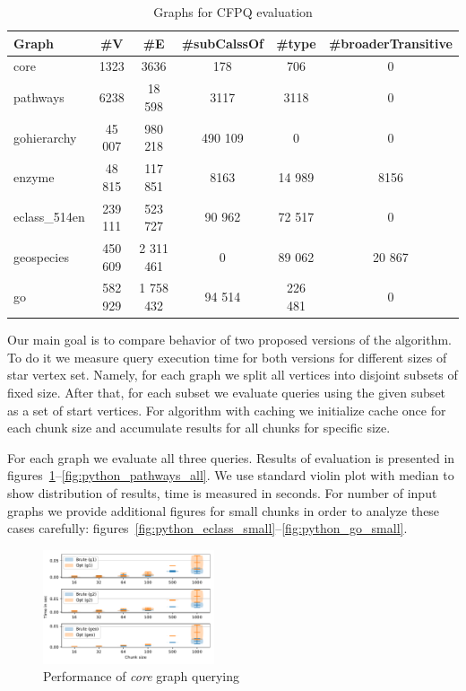 {\setlength{\tabcolsep}{0.2em}
\begin{table}
{
\caption{Graphs for CFPQ evaluation}
\label{tbl:graphs_for_cfpq}
\small
{}
\begin{tabular}{|l|c|c|c|c|c|}
\hline
Graph          & \#V       & \#E        & \#subCalssOf & \#type &\#broaderTransitive\\
\hline
\hline
core                        & 1323     & 3636       & 178       & 706      & 0      \\ 
pathways                    & 6238     & 18 598     & 3117      & 3118     & 0      \\ 
gohierarchy                 & 45 007   & 980 218    & 490 109   & 0        & 0      \\ 
enzyme                      & 48 815   & 117 851    & 8163      & 14 989   & 8156   \\ 
eclass\_514en               & 239 111  & 523 727    & 90 962    & 72 517   & 0      \\ 
geospecies                  & 450 609  & 2 311 461  & 0         & 89 062   & 20 867 \\
go                          & 582 929  & 1 758 432  & 94 514    & 226 481  & 0      \\ 
\hline
\end{tabular}
}
\end{table}
}


Our main goal is to compare behavior of two proposed versions of the algorithm.
To do it we measure query execution time for both versions for different sizes of star vertex set. 
Namely, for each graph we split all vertices into disjoint subsets of fixed size.
After that, for each subset we evaluate queries using the given subset as a set of start vertices. 
For algorithm with caching we initialize cache once for each chunk size and accumulate results for all chunks for specific size.

For each graph we evaluate all three queries. 
Results of evaluation is presented in figures~\ref{fig:python_core_all}--\ref{fig:python_pathways_all}.
We use standard violin plot with median to show distribution of results, time is measured in seconds.
For number of input graphs we provide additional figures for small chunks in order to analyze these cases carefully: figures~\ref{fig:python_eclass_small}--\ref{fig:python_go_small}.

\begin{figure}[h]
\centering
\includegraphics[width=0.45\textwidth]{data/raw/core.pdf}
\caption{Performance of \textit{core} graph querying}
\label{fig:python_core_all}
\end{figure}

